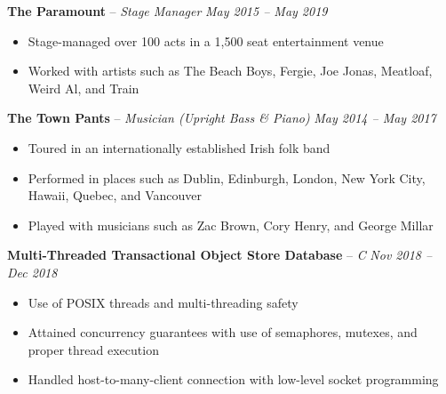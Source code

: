 \documentclass[10pt,letterpaper]{article}
\begin{document}

\headedsection 
{\textbf{The Paramount} -- \textit{Stage Manager}}
{\textit{May 2015 -- May 2019}} {
	\begin{itemize}[noitemsep,nolistsep]
		\item Stage-managed over 100 acts in a 1,500 seat entertainment venue
		\item Worked with artists such as The Beach Boys, Fergie, Joe Jonas, Meatloaf, Weird Al, and Train
	\end{itemize}
}
\vspace{-1mm}


\headedsection 
{\textbf{The Town Pants} -- \textit{Musician (Upright Bass \& Piano)}}
{\textit{May 2014 -- May 2017}} {
	\begin{itemize}[noitemsep,nolistsep]
		\item Toured in an internationally established Irish folk band
		\item Performed in places such as Dublin, Edinburgh, London, New York City, Hawaii, Quebec, and Vancouver
		\item Played with musicians such as Zac Brown, Cory Henry, and George Millar
	\end{itemize}
}

\spacedhrule{0em}{-0.8em} 










\headedsection 
{\textbf{Multi-Threaded Transactional Object Store Database} -- \textit{C}}
{\textit{Nov 2018 -- Dec 2018}} {
	\begin{itemize}[noitemsep,nolistsep]
		\item Use of POSIX threads and multi-threading safety
		\item Attained concurrency guarantees with use of semaphores, mutexes, and proper thread execution
		\item Handled host-to-many-client connection with low-level socket programming
	\end{itemize}
}
				
\end{document}
